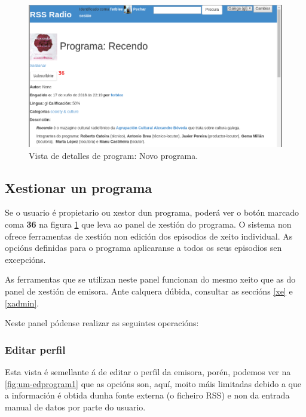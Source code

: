 \begin{figure}[H]
	\centering
	\includegraphics[scale=0.43,keepaspectratio=true]{./images/usermanual/um-programd2.png}
	\caption{Vista de detalles de program: Novo programa.}
	\label{fig:um-programd2}
\end{figure}


\subsection{Xestionar un programa}

Se o usuario é propietario ou xestor dun programa, poderá ver o botón marcado coma \textbf{36} na figura \ref{fig:um-programd2} que leva ao panel de xestión do programa. O sistema non ofrece ferramentas de xestión non edición dos episodios de xeito individual. As opcións definidas para o programa aplicaranse a todos os seus episodios sen excepcións.

As ferramentas que se utilizan neste panel funcionan do mesmo xeito que as do panel de xestión de emisora. Ante calquera dúbida, consultar as seccións \ref{xe} e \ref{xadmin}.

Neste panel pódense realizar as seguintes operacións:

\subsubsection{Editar perfil}

Esta vista é semellante á de editar o perfil da emisora, porén, podemos ver na \ref{fig:um-edprogram1} que as opcións son, aquí, moito máis limitadas debido a que a información é obtida dunha fonte externa (o ficheiro RSS) e non da entrada manual de datos por parte do usuario.


